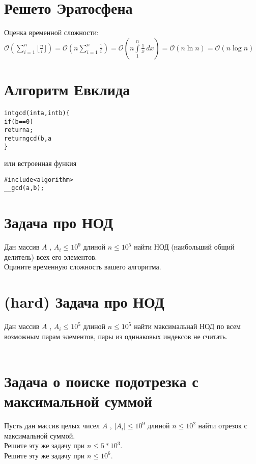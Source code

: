\documentclass[10pt]{article}
\begin{document}
    \section{Решето Эратосфена}
    
    Оценка временной сложности:
    \\
    $\mathcal{O}(\sum\limits_{i=1}^n\lfloor \frac{n}{i} \rfloor) = \mathcal{O}(n\sum\limits_{i=1}^n \frac{1}{i})  =  \mathcal{O}(n \int\limits_{1}^n \frac{1}{x}\,dx) = \mathcal{O}(n \ln n) = \mathcal{O}(n \log n)$
    
    \section{Алгоритм Евклида}
        \begin{alltt}
int gcd(int a, int b) \{
    if (b == 0)
        return a;
    return gcd(b, a % b);
\}
    \end{alltt}
или встроенная функия
    \begin{alltt}
#include<algorithm>
__gcd(a , b);
    \end{alltt}
    \section{Задача про НОД} Дан массив $A$ , $A_i \leq 10^9$  длиной $n \leq 10^5$ найти НОД (наибольший общий делитель) всех его элементов.
    \\
    Оцините временную сложность вашего алгоритма.
    \\
    
    \section{(hard) Задача про НОД}
    Дан массив $A$ , $A_i \leq 10^5$  длиной $n \leq 10^5$ найти максимальнай НОД по всем возможным парам элементов, пары из одинаковых индексов не считать.
    \\
    \\
    
    \section{Задача о поиске подотрезка с максимальной суммой}
    Пусть дан массив целых чисел $A$ , $|A_i| \leq 10^9$  длиной $n \leq 10^2$ найти отрезок с максимальной суммой.
    \\
    Решите эту же задачу при $n \leq 5*10^3$.
    \\
    Решите эту же задачу при $n \leq 10^6$.
    
\end{document}
